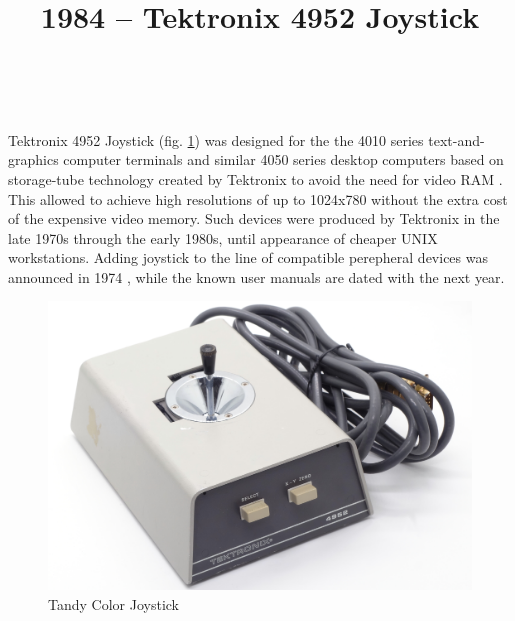 \documentclass[11pt, a4paper]{article}
\begin{document}
\title{1984 -- Tektronix 4952 Joystick}
\date{}
\author{~}
\maketitle
{}

Tektronix 4952 Joystick (fig. \ref{fig:TektronixJoystickPic}) was designed for the the 4010 series text-and-graphics computer terminals and similar 4050 series desktop computers based on storage-tube technology created by Tektronix to avoid the need for video RAM \cite{wiki}.  This allowed to achieve high resolutions of up to 1024x780 without the extra cost of the expensive video memory. Such devices were produced by Tektronix in the late 1970s through the early 1980s, until appearance of cheaper UNIX workstations. Adding joystick to the line of compatible perepheral devices was announced in 1974 \cite{adv}, while the known user manuals are dated with the next year.

\begin{figure}[h]
   \centering
    \includegraphics[scale=0.66]{1975_Tektronix_4952_Joystick/pic_30.jpg}
    \caption{Tandy Color Joystick}
    \label{fig:TektronixJoystickPic}
\end{figure}
\end{document}
